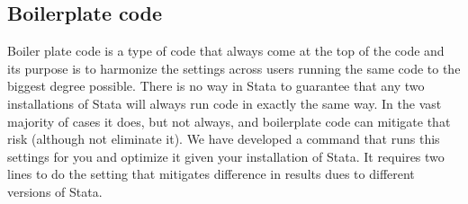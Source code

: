 
\subsection{Boilerplate code}

Boiler plate code is a type of code that always come at the top of the code and its purpose is to harmonize 
the settings across users running the same code to the biggest degree possible. There is no way in Stata to 
guarantee that any two installations of Stata will always run code in exactly the same way. In the vast 
majority of cases it does, but not always, and boilerplate code can mitigate that risk (although not eliminate 
it). We have developed a command that runs this settings for you and optimize it given your installation of 
Stata. It requires two lines to do the setting that mitigates difference in results dues to different versions 
of Stata. 

\mainmatter
